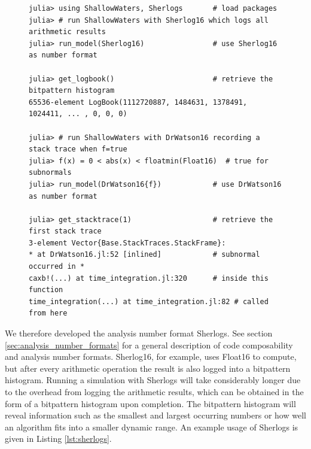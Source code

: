 \begin{figure}[tbhp]
\begin{lstlisting}[language=JuliaLocal, label=lst:sherlogs, caption={\textbf{Example usage and output of Sherlogs.jl,
a package for Sherlogs and DrWatson, two analysis-number formats that can be combined with type-flexible
functions in Julia.} Using Sherlog16 as the first argument of \texttt{run\_model} runs ShallowWaters.jl with Float16 but
also logs the bitpattern of every arithmetic result into a \emph{logbook} of length $2^{16}=65536$ to create a bitpattern
histogram. \texttt{DrWatson16\{f\}} uses Float16 but also records a stack trace (a list of calling functions and respective
lines of code) every time the function \texttt{f(x)} evaluates to \texttt{true} with the arithmetic result \texttt{x}.
Here, a subnormal arises in a multiplication ($*$ in line 14 here) in line 320 of the code in script \texttt{time\_integration.jl.}}]
julia> using ShallowWaters, Sherlogs       # load packages
julia> # run ShallowWaters with Sherlog16 which logs all arithmetic results
julia> run_model(Sherlog16)                # use Sherlog16 as number format

julia> get_logbook()                       # retrieve the bitpattern histogram
65536-element LogBook(1112720887, 1484631, 1378491, 1024411, ... , 0, 0, 0)

julia> # run ShallowWaters with DrWatson16 recording a stack trace when f=true
julia> f(x) = 0 < abs(x) < floatmin(Float16)  # true for subnormals
julia> run_model(DrWatson16{f})            # use DrWatson16 as number format

julia> get_stacktrace(1)                   # retrieve the first stack trace
3-element Vector{Base.StackTraces.StackFrame}:
* at DrWatson16.jl:52 [inlined]            # subnormal occurred in *
caxb!(...) at time_integration.jl:320      # inside this function
time_integration(...) at time_integration.jl:82 # called from here
\end{lstlisting}
\end{figure}

We therefore developed the analysis number format Sherlogs. See section \ref{sec:analysis_number_formats} for a general
description of code composability and analysis number formats. Sherlog16, for example, uses Float16 to compute,
but after every arithmetic operation the result is also logged into a bitpattern histogram. Running a simulation with
Sherlogs will take considerably longer due to the overhead from logging the arithmetic results, which can be obtained
in the form of a bitpattern histogram upon completion. The bitpattern histogram will reveal information such as the
smallest and largest occurring numbers or how well an algorithm fits into a smaller dynamic range.
An example usage of Sherlogs is given in Listing \ref{lst:sherlogs}.


